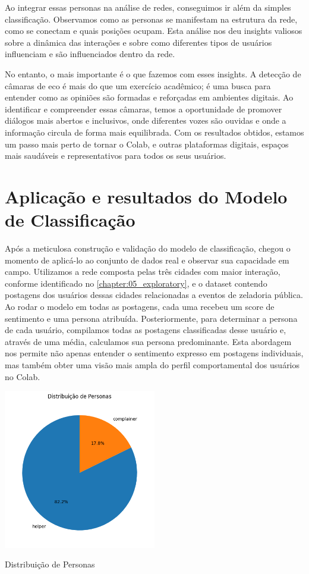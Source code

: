 Ao integrar essas personas na análise de redes, conseguimos ir além da simples classificação. Observamos como as personas se manifestam na estrutura da rede, como se conectam e quais posições ocupam. Esta análise nos deu insights valiosos sobre a dinâmica das interações e sobre como diferentes tipos de usuários influenciam e são influenciados dentro da rede.

No entanto, o mais importante é o que fazemos com esses insights. A detecção de câmaras de eco é mais do que um exercício acadêmico; é uma busca para entender como as opiniões são formadas e reforçadas em ambientes digitais. Ao identificar e compreender essas câmaras, temos a oportunidade de promover diálogos mais abertos e inclusivos, onde diferentes vozes são ouvidas e onde a informação circula de forma mais equilibrada. Com os resultados obtidos, estamos um passo mais perto de tornar o Colab, e outras plataformas digitais, espaços mais saudáveis e representativos para todos os seus usuários.

\section{Aplicação e resultados do Modelo de Classificação}

Após a meticulosa construção e validação do modelo de classificação, chegou o momento de aplicá-lo ao conjunto de dados real e observar sua capacidade em campo. Utilizamos a rede composta pelas três cidades com maior interação, conforme identificado no \autoref{chapter:05_exploratory}, e o dataset contendo postagens dos usuários dessas cidades relacionadas a eventos de zeladoria pública. Ao rodar o modelo em todas as postagens, cada uma recebeu um score de sentimento e uma persona atribuída. Posteriormente, para determinar a persona de cada usuário, compilamos todas as postagens classificadas desse usuário e, através de uma média, calculamos sua persona predominante. Esta abordagem nos permite não apenas entender o sentimento expresso em postagens individuais, mas também obter uma visão mais ampla do perfil comportamental dos usuários no Colab.

\begin{quadro}[htb]
    \centering
    \includegraphics[width=0.5\textwidth]{images/personas_pie.png}
    \caption{Distribuição de Personas}
    \label{fig:personas_pie}
\end{quadro}

